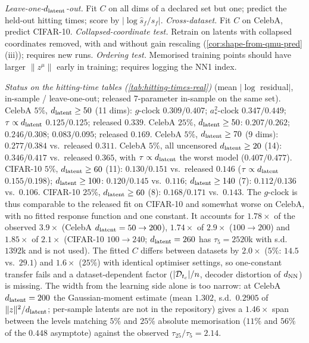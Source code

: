 \emph{Leave-one-$d_{\mathrm{latent}}$-out.} Fit $C$ on all dims of a declared set but one; predict the held-out hitting times; score by $|\log\hat s_f/s_f|$. \emph{Cross-dataset.} Fit $C$ on CelebA, predict CIFAR-10. \emph{Collapsed-coordinate test.} Retrain on latents with collapsed coordinates removed, with and without gain rescaling (\cref{cor:shape-from-qmu-pred}(iii)); requires new runs. \emph{Ordering test.} Memorised training points should have larger $\|z^\mu\|$ early in training; requires logging the NN1 index.

\emph{Status on the hitting-time tables (\cref{tab:hitting-times-real})} (mean $|\log$ residual$|$, in-sample / leave-one-out; released 7-parameter in-sample on the same set). CelebA $5\%$, $d_{\mathrm{latent}}\ge50$ (11 dims): $g$-clock $0.309/0.407$; $a_*^2$-clock $0.347/0.449$; $\tau\propto d_{\mathrm{latent}}$ $0.125/0.125$; released $0.339$. CelebA $25\%$, $d_{\mathrm{latent}}\ge50$: $0.207/0.262$; $0.246/0.308$; $0.083/0.095$; released $0.169$. CelebA $5\%$, $d_{\mathrm{latent}}\ge70$ (9 dims): $0.277/0.384$ vs.\ released $0.311$. CelebA $5\%$, all uncensored $d_{\mathrm{latent}}\ge20$ (14): $0.346/0.417$ vs.\ released $0.365$, with $\tau\propto d_{\mathrm{latent}}$ the worst model ($0.407/0.477$). CIFAR-10 $5\%$, $d_{\mathrm{latent}}\ge60$ (11): $0.130/0.151$ vs.\ released $0.146$ ($\tau\propto d_{\mathrm{latent}}$ $0.155/0.198$); $d_{\mathrm{latent}}\ge100$: $0.120/0.145$ vs.\ $0.116$; $d_{\mathrm{latent}}\ge140$ (7): $0.112/0.136$ vs.\ $0.106$. CIFAR-10 $25\%$, $d_{\mathrm{latent}}\ge60$ (8): $0.168/0.171$ vs.\ $0.143$. The $g$-clock is thus comparable to the released fit on CIFAR-10 and somewhat worse on CelebA, with no fitted response function and one constant. It accounts for $1.78\times$ of the observed $3.9\times$ (CelebA $d_{\mathrm{latent}}=50\to200$), $1.74\times$ of $2.9\times$ ($100\to200$) and $1.85\times$ of $2.1\times$ (CIFAR-10 $100\to240$; $d_{\mathrm{latent}}=260$ has $\tau_5=2520$k with s.d.\ $1392$k and is not used). The fitted $C$ differs between datasets by $2.0\times$ ($5\%$: $14.5$ vs.\ $29.1$) and $1.6\times$ ($25\%$) with identical optimiser settings, so one-constant transfer fails and a dataset-dependent factor ($|\mathcal D_{t_c}|/n$, decoder distortion of $d_{\rm NN}$) is missing. The width from the learning side alone is too narrow: at CelebA $d_{\mathrm{latent}}=200$ the Gaussian-moment estimate (mean $1.302$, s.d.\ $0.2905$ of $\|z\|^2/d_{\mathrm{latent}}$; per-sample latents are not in the repository) gives a $1.46\times$ span between the levels matching $5\%$ and $25\%$ absolute memorisation ($11\%$ and $56\%$ of the $0.448$ asymptote) against the observed $\tau_{25}/\tau_5=2.14$.

